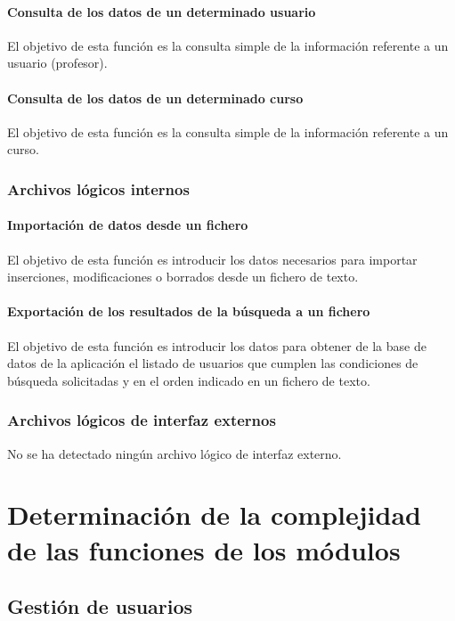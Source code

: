 \documentclass[11pt,a4paper,spanish,twoside]{book}
\begin{document}
\subsubsection{Consulta de los datos de un determinado usuario}
El objetivo de esta función es la consulta simple de la información referente
a un usuario (profesor).

\subsubsection{Consulta de los datos de un determinado curso}
El objetivo de esta función es la consulta simple de la información referente
a un curso.

\subsection{Archivos lógicos internos}
\subsubsection{Importación de datos desde un fichero}
El objetivo de esta función es introducir los datos necesarios para importar 
inserciones, modificaciones o borrados desde un fichero de texto.

\subsubsection{Exportación de los resultados de la búsqueda a un fichero}
El objetivo de esta función es introducir los datos para obtener de la base
de datos de la aplicación el listado de usuarios que cumplen las condiciones de
búsqueda solicitadas y en el orden indicado en un fichero de texto.

\subsection{Archivos lógicos de interfaz externos}
No se ha detectado ningún archivo lógico de interfaz externo.

\chapter[Complejidad de las funciones de los módulos]{Determinación de la
  complejidad de las funciones de los  módulos}
\section{Gestión de usuarios}
\end{document}
